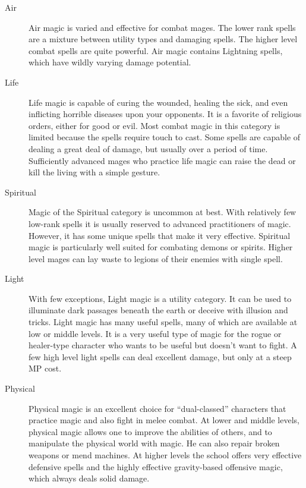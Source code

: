 \begin{description}
\item[Air] Air magic is varied and effective for combat mages.  The
  lower rank spells are a mixture between utility types and damaging
  spells.  The higher level combat spells are quite powerful.  Air
  magic contains Lightning spells, which have wildly varying damage
  potential.

\item[Life] Life magic is capable of curing the wounded, healing the
  sick, and even inflicting horrible diseases upon your opponents.  It
  is a favorite of religious orders, either for good or evil.  Most
  combat magic in this category is limited because the spells require
  touch to cast.  Some spells are capable of dealing a great deal of
  damage, but usually over a period of time.  Sufficiently advanced
  mages who practice life magic can raise the dead or kill the living
  with a simple gesture.

\item[Spiritual] Magic of the Spiritual category is uncommon at best.
  With relatively few low-rank spells it is usually reserved to
  advanced practitioners of magic.  However, it has some unique spells
  that make it very effective.  Spiritual magic is particularly well
  suited for combating demons or spirits.  Higher level mages can lay
  waste to legions of their enemies with single spell.

\item[Light] With few exceptions, Light magic is a utility category.
  It can be used to illuminate dark passages beneath the earth or
  deceive with illusion and tricks.  Light magic has many useful
  spells, many of which are available at low or middle levels.  It is
  a very useful type of magic for the rogue or healer-type character
  who wants to be useful but doesn't want to fight.  A few high level
  light spells can deal excellent damage, but only at a steep MP cost.

\item[Physical] Physical magic is an excellent choice for
  ``dual-classed'' characters that practice magic and also fight in
  melee combat.  At lower and middle levels, physical magic allows one
  to improve the abilities of others, and to manipulate the physical
  world with magic.  He can also repair broken weapons or mend
  machines.  At higher levels the school offers very effective
  defensive spells and the highly effective gravity-based offensive
  magic, which always deals solid damage.


\end{description}
